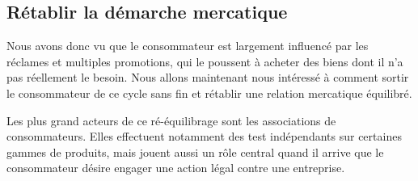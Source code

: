 \subsection{Rétablir la démarche mercatique}
\medbreak
Nous avons donc vu que le consommateur est largement influencé par les réclames et multiples promotions, qui le poussent à acheter des biens dont il n'a pas réellement le besoin. Nous allons maintenant nous intéressé à comment sortir le consommateur de ce cycle sans fin et rétablir une relation mercatique équilibré.

\smallbreak
Les plus grand acteurs de ce ré-équilibrage sont les associations de consommateurs. %
Elles effectuent notamment des test indépendants sur certaines gammes de produits, mais jouent aussi un rôle central quand il arrive que le consommateur désire engager une action légal contre une entreprise.

